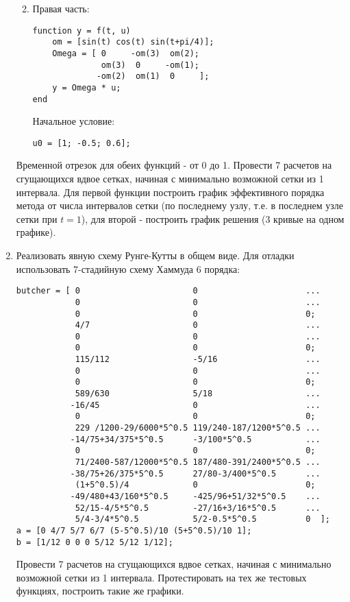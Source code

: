 \begin{enumerate}
\begin{enumerate}
\begin{matlablisting}
\end{matlablisting}
\item Правая часть:
\begin{matlablisting}
	\begin{lstlisting}
function y = f(t, u)
    om = [sin(t) cos(t) sin(t+pi/4)];
    Omega = [ 0     -om(3)  om(2); 
              om(3)  0     -om(1);
             -om(2)  om(1)  0     ];
    y = Omega * u;
end
	\end{lstlisting}
\end{matlablisting}
Начальное условие:
\begin{matlablisting}
	\begin{lstlisting}
u0 = [1; -0.5; 0.6];
	\end{lstlisting}
\end{matlablisting}
\end{enumerate}
Временной отрезок для обеих функций - от 0 до 1. Провести 7 расчетов на сгущающихся вдвое сетках, начиная с минимально возможной сетки из 1 интервала. Для первой функции построить график эффективного порядка метода от числа интервалов сетки (по последнему узлу, т.е. в последнем узле сетки при $t=1$), для второй - построить график решения (3 кривые на одном графике). 
\item Реализовать явную схему Рунге-Кутты в общем виде. Для отладки использовать 7-стадийную схему Хаммуда 6 порядка:
\begin{matlablisting}
	\begin{lstlisting}
butcher = [ 0                       0                      ...
            0                       0                      ...
            0                       0                      0;
            4/7                     0                      ...
            0                       0                      ... 
            0                       0                      0;
            115/112                 -5/16                  ...  
            0                       0                      ...
            0                       0                      0;
            589/630                 5/18                   ...
           -16/45                   0                      ...
            0                       0                      0;
            229 /1200-29/6000*5^0.5 119/240-187/1200*5^0.5 ...
           -14/75+34/375*5^0.5      -3/100*5^0.5           ...        
            0                       0                      0;
            71/2400-587/12000*5^0.5 187/480-391/2400*5^0.5 ...
           -38/75+26/375*5^0.5      27/80-3/400*5^0.5      ...
            (1+5^0.5)/4             0                      0;
           -49/480+43/160*5^0.5     -425/96+51/32*5^0.5    ...   
            52/15-4/5*5^0.5         -27/16+3/16*5^0.5      ...
            5/4-3/4*5^0.5           5/2-0.5*5^0.5          0  ];
a = [0 4/7 5/7 6/7 (5-5^0.5)/10 (5+5^0.5)/10 1];
b = [1/12 0 0 0 5/12 5/12 1/12];
	\end{lstlisting}
\end{matlablisting}
Провести 7 расчетов на сгущающихся вдвое сетках, начиная с минимально возможной сетки из 1 интервала. Протестировать на тех же тестовых функциях, построить такие же графики.
\end{enumerate}